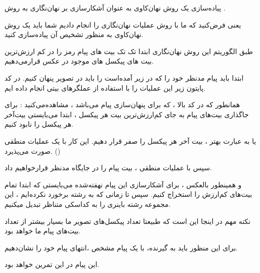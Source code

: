 \begin{boxD}
پیاده‌سازی یک روش نهان‌کاوی به عنوان آشکارسازی بر نهان‌نگاری به روش
.

یعنی فرض‌کنید که ما با روش
عملیات نهان‌نگاری را انجام دادیم شما باید یک روش نهان‌کاوی به منظور تشخیص آن پیاده‌سازی کنید.
\end{boxD}

\begin{boxA}
طبق الگوریتم این روش نهان‌نگاری ابتدا تک تک بیت های پیام رمز
را در کم ارزش‌ترین بیت های پیکسل های موجود در عکس قرار‌می‌دهیم.

ابتدا باید پیام مدنظر خود را که در زیر آمده‌است را باید در تصویر پنهان کنیم.
در کد پایتون زیر این عملیات را با استفاده از عملگرهای بیتی انجام داده ایم.

\end{boxA}

\begin{boxE}
    \lr{}
\end{boxE}

\begin{boxA}
     همانطور که در کد بالا ، که برای پنهان‌سازی پیام می‌باشد ، مشاهده‌می‌کنید :
     برای جاگذاری بیت‌های پیام به جای کم‌ارزش‌ترین بیت هر پیکسل ، 
     ابتدا می‌بایستی بیت‌آخر هر پیکسل را نابود کنیم.

     یا به عبارت بهتر ، بیت آخر هر پیکسل را صفر قرار دهیم.
     این کار با یک عملیات 
     منطقی صورت می‌پذیرد.
     ()

     \newline
    
     سپس با عملیات 
     منطقی ، بیت پیام را در جایگاه مدنظر قرارخواهیم داد.

     و همینطور بالعکس ، برای آشکارسازی این پیام نهفته‌شده می‌بایستی که ابتدا تمام بیت‌های کم‌ارزش را استخراج کنیم.
     سپس تا زمانی که به رشته
     برخورد نکرده‌ایم ، این مجموعه رشته باینری را به کداسکی متناظر تبدیل میکنیم.

     نکته مهم در اینجا این است که طبیعتا تعداد پیکسل‌های تصویر ما بسیار بیشتر از تعداد بیت‌های پیام ما خواهد بود.
     
     برای این منظور باید به گیرنده،  با یک پیام مشخص ،انتهای پیام خود را 
    نشان‌دهیم.

    این پیام در این تمرین
    خواهد بود.

\end{boxA}

